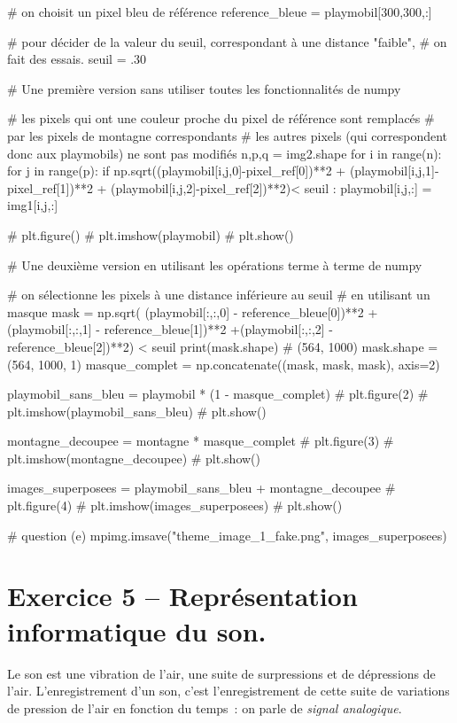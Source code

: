 \documentclass[10pt,fleqn]{article} %
\begin{document}
\begin{multicols}{2}
\begin{corrige}
\begin{python}
# on choisit un pixel bleu de référence
reference_bleue = playmobil[300,300,:]

# pour décider de la valeur du seuil, correspondant à une distance "faible",
# on fait des essais. 
seuil = .30

# Une première version sans utiliser toutes les fonctionnalités de numpy

# les pixels qui ont une couleur proche du pixel de référence sont remplacés
# par les pixels de montagne correspondants
# les autres pixels (qui correspondent donc aux playmobils) ne sont pas modifiés
n,p,q = img2.shape
for i in range(n):
    for j in range(p):
        if np.sqrt((playmobil[i,j,0]-pixel_ref[0])**2 + (playmobil[i,j,1]-pixel_ref[1])**2
                   + (playmobil[i,j,2]-pixel_ref[2])**2)< seuil :
            playmobil[i,j,:] = img1[i,j,:]

# plt.figure()
# plt.imshow(playmobil)
# plt.show()

# Une deuxième version en utilisant les opérations terme à terme de numpy

# on sélectionne les pixels à une distance inférieure au seuil
# en utilisant un masque
mask = np.sqrt( (playmobil[:,:,0] - reference_bleue[0])**2
               +(playmobil[:,:,1] - reference_bleue[1])**2
               +(playmobil[:,:,2] - reference_bleue[2])**2) < seuil
print(mask.shape)
# (564, 1000)
mask.shape = (564, 1000, 1)
masque_complet = np.concatenate((mask, mask, mask), axis=2)

playmobil_sans_bleu = playmobil * (1 - masque_complet)
# plt.figure(2)
# plt.imshow(playmobil_sans_bleu)
# plt.show()

montagne_decoupee = montagne * masque_complet
# plt.figure(3)
# plt.imshow(montagne_decoupee)
# plt.show()

images_superposees = playmobil_sans_bleu + montagne_decoupee
# plt.figure(4)
# plt.imshow(images_superposees)
# plt.show()

# question (e)
mpimg.imsave("theme_image_1_fake.png", images_superposees)
\end{python}
\end{corrige}
\else
\fi



\section*{Exercice 5 -- Représentation informatique du son.}

\ifprof
\else
Le son est une vibration de l'air, une suite de surpressions et de
dépressions de l'air. L'enregistrement d'un son, c'est
l'enregistrement de cette suite de variations de pression de l'air en
fonction du temps~: on parle de \emph{signal analogique}.


\end{multicols}
\end{document}
